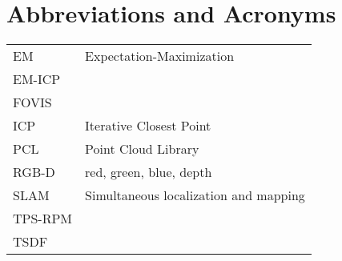 \chapter*{Abbreviations and Acronyms}


\noindent
\begin{longtable}{@{}p{}p{}@{}}
        EM & Expectation-Maximization \\
    EM-ICP & \\
     FOVIS & \\
       ICP & Iterative Closest Point \\
       PCL & Point Cloud Library \\
     RGB-D & red, green, blue, depth \\
      SLAM & Simultaneous localization and mapping \\
   TPS-RPM & \\
      TSDF & \\
\end{longtable}

